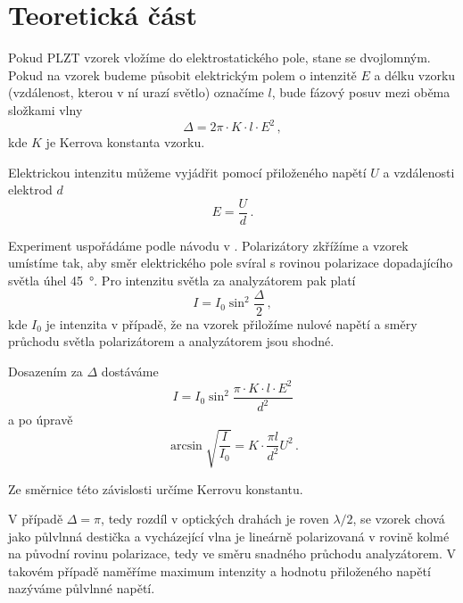 \section*{Teoretická část}
Pokud PLZT vzorek vložíme do elektrostatického pole, stane se dvojlomným.
Pokud na vzorek budeme působit elektrickým polem o intenzitě $E$ a délku vzorku (vzdálenost, kterou v ní urazí světlo) označíme $l$, bude fázový posuv mezi oběma složkami vlny \cite{zfp}
\begin{equation}
\Delta = 2\pi \cdot K \cdot l \cdot E^2 \,,
\end{equation}
kde $K$ je Kerrova konstanta vzorku.

Elektrickou intenzitu můžeme vyjádřit pomocí přiloženého napětí $U$ a vzdálenosti elektrod $d$
\begin{equation}
E=\frac{U}{d} \,.
\end{equation}

Experiment uspořádáme podle návodu v \cite{zfp}. Polarizátory zkřížíme a vzorek umístíme tak, aby směr elektrického pole svíral s rovinou polarizace dopadajícího světla úhel \SI{45}{\degree}. Pro intenzitu světla za analyzátorem pak platí \cite{zfp}
\begin{equation}
I=I_0 \sin^2 \frac{\Delta}{2} \,,
\end{equation}
kde $I_0$ je intenzita v případě, že na vzorek přiložíme nulové napětí a směry průchodu světla polarizátorem a analyzátorem jsou shodné.

Dosazením za $\Delta$ dostáváme
\begin{equation}
I=I_0 \sin^2 \frac{\pi \cdot K \cdot  l \cdot E^2}{d^2}
\end{equation}
a po úpravě
\begin{equation}
\arcsin \sqrt{\frac{I}{I_0}} = K \cdot \frac{\pi l}{d^2} U^2 \,.
\end{equation}

Ze směrnice této závislosti určíme Kerrovu konstantu.

V případě $\Delta = \pi$, tedy rozdíl v optických drahách je roven $\lambda/2$, se vzorek chová jako půlvlnná destička a vycházející vlna je lineárně polarizovaná v rovině kolmé na původní rovinu polarizace, tedy ve směru snadného průchodu analyzátorem. V takovém případě naměříme maximum intenzity a hodnotu přiloženého napětí nazýváme půlvlnné napětí.
